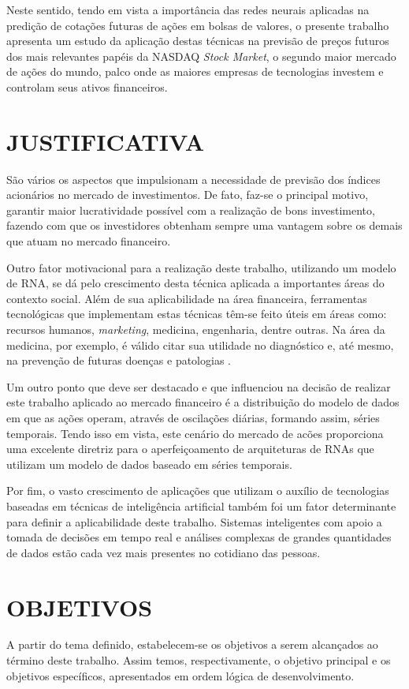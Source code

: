 Neste sentido, tendo em vista a importância das redes neurais aplicadas na predição de cotações futuras de ações em bolsas de valores, o presente trabalho apresenta um estudo da aplicação destas técnicas na previsão de preços futuros dos mais relevantes papéis da NASDAQ \textit{Stock Market}, o segundo maior mercado de ações do mundo, palco onde as maiores empresas de tecnologias investem e controlam seus ativos financeiros.


\section{JUSTIFICATIVA}\label{sec:justificativa}

São vários os aspectos que impulsionam a necessidade de previsão dos índices acionários no mercado de investimentos. De fato, faz-se o principal motivo, garantir maior lucratividade possível com a realização de bons investimento, fazendo com que os investidores obtenham sempre uma vantagem sobre os demais que atuam no mercado financeiro.

Outro fator motivacional para a realização deste trabalho, utilizando um modelo de RNA, se dá pelo crescimento desta técnica aplicada a importantes áreas do contexto social. Além de sua aplicabilidade na área financeira, ferramentas tecnológicas que implementam estas técnicas têm-se feito úteis em áreas como: recursos humanos, \textit{marketing}, medicina, engenharia, dentre outras. Na área da medicina, por exemplo, é válido citar sua utilidade no diagnóstico e, até mesmo, na prevenção de futuras doenças e patologias \cite{marangoni}.

Um outro ponto que deve ser destacado e que influenciou na decisão de realizar este trabalho aplicado ao mercado financeiro é a distribuição do modelo de dados em que as ações operam, através de oscilações diárias, formando assim, séries temporais. Tendo isso em vista, este cenário do mercado de acões proporciona uma excelente diretriz para o aperfeiçoamento de arquiteturas de RNAs que utilizam um modelo de dados baseado em séries temporais.

Por fim, o vasto crescimento de aplicações que utilizam o auxílio de tecnologias baseadas em técnicas de inteligência artificial também foi um fator determinante para definir a aplicabilidade deste trabalho. Sistemas inteligentes com apoio a tomada de decisões em tempo real e análises complexas de grandes quantidades de dados estão cada vez mais presentes no cotidiano das pessoas.

\section{OBJETIVOS}\label{sec:objetivos}
A partir do tema definido, estabelecem-se os objetivos a serem alcançados ao término deste trabalho. Assim temos, respectivamente, o objetivo principal e os objetivos específicos, apresentados em ordem lógica de desenvolvimento.
